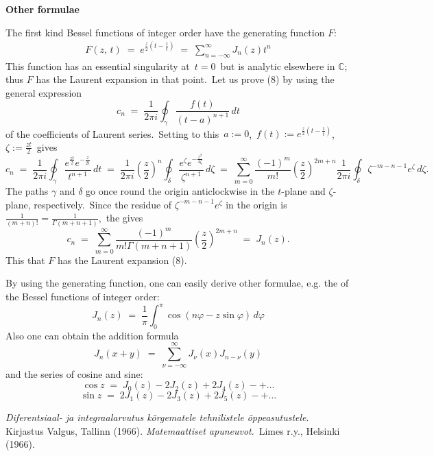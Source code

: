 \documentclass[12pt]{article}
\begin{document}
\textbf{Other formulae}

The first kind Bessel functions of integer order have the generating function $F$:
\begin{align}
F(z,\,t) \;=\; e^{\frac{z}{2}(t-\frac{1}{t})} \;=\; \sum_{n=-\infty}^\infty J_n(z)t^n
\end{align}
This function has an essential singularity at\, $t = 0$\, but is analytic elsewhere in $\mathbb{C}$; thus $F$ has the Laurent expansion in that point.\, Let us prove (8) by using the general expression
$$c_n \;=\; \frac{1}{2\pi i}\oint_{\gamma} \frac{f(t)}{(t-a)^{n+1}}\,dt$$
of the coefficients of Laurent series.\, Setting to this\, $a := 0$,\, 
$f(t) := e^{\frac{z}{2}(t-\frac{1}{t})}$,\, $\zeta := \frac{zt}{2}$\, gives
$$c_n \;=\; \frac{1}{2\pi i}
\oint_\gamma\frac{e^{\frac{zt}{2}}e^{-\frac{z}{2t}}}{t^{n+1}}\,dt \;=\; 
\frac{1}{2\pi i}\left(\frac{z}{2}\right)^n\!
\oint_\delta\frac{e^\zeta e^{-\frac{z^2}{4\zeta}}}{\zeta^{n+1}}\,d\zeta \;=\; 
\sum_{m=0}^\infty\frac{(-1)^m}{m!}\left(\frac{z}{2}\right)^{2m+n}\!
\frac{1}{2\pi i}\oint_\delta \zeta^{-m-n-1}e^\zeta\,d\zeta.$$
The paths $\gamma$ and $\delta$ go once round the origin anticlockwise in the $t$-plane and $\zeta$-plane, respectively.\, Since the residue of $\zeta^{-m-n-1}e^\zeta$ in the origin is\, $\frac{1}{(m+n)!} = \frac{1}{\Gamma(m+n+1)}$,\, the  gives
$$c_n \;=\; \sum_{m=0}^\infty
\frac{(-1)^m}{m!\Gamma(m+n+1)}\left(\frac{z}{2}\right)^{2m+n} \;=\; J_n(z).$$
This  that $F$ has the Laurent expansion (8).

By using the generating function, one can easily derive other formulae, e.g.
the  of the Bessel functions of integer order:
$$J_n(z) \;=\; \frac{1}{\pi}\int_0^\pi\cos(n\varphi-z\sin{\varphi})\,d\varphi$$
Also one can obtain the addition formula
$$J_n(x\!+\!y) \;=\; \sum_{\nu=-\infty}^{\infty}J_\nu(x)J_{n-\nu}(y)$$
and the series  of cosine and sine:
$$\cos{z} \;=\; J_0(z)-2J_2(z)+2J_4(z)-+\ldots$$
$$\sin{z} \;=\; 2J_1(z)-2J_3(z)+2J_5(z)-+\ldots$$



\begin{thebibliography}{9}
 {\em Diferentsiaal- ja integraalarvutus k\~{o}rgematele tehnilistele \~{o}ppeasutustele}.\, Kirjastus Valgus, Tallinn  (1966).
 {\em Matemaattiset apuneuvot}.\, Limes r.y., Helsinki (1966).
\end{thebibliography}


\end{document}
